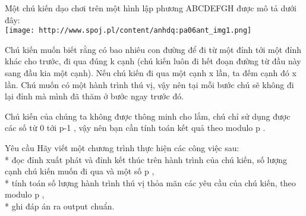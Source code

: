 Một chú kiến dạo chơi trên một hình lập phương ABCDEFGH được mô tả dưới đây:   
\\
\texttt{[image: http://www.spoj.pl/content/anhdq:pa06ant\_img1.png]}



   Chú kiến muốn biết rằng có bao nhiêu con đường để đi từ một đỉnh tới một đỉnh khác cho trước, đi qua đúng       k      cạnh (chú kiến luôn đi hết đoạn đường từ đầu này sang đầu kia một cạnh). Nếu chú kiến đi qua một cạnh       x      lần, ta đếm cạnh đó       x      lần. Chú muốn có một hành trình thú vị, vậy nên tại mỗi bước chú sẽ không đi lại đỉnh mà mình đã thăm ở bước ngay trước đó.  

   Chú kiến của chúng ta không được thông minh cho lắm, chú chỉ sử dụng được các số từ       0      tới       p-1      , vậy nên bạn cần tính toán kết quả theo modulo       p      .  

Yêu cầu
Hãy viết một chương trình thực hiện các công việc sau:   
\\   * đọc đỉnh xuất phát và đỉnh kết thúc trên hành trình của chú kiến, số lượng cạnh chú kiến muốn đi qua và một số       p      ,   
\\   * tính toán số lượng hành trình thú vị thỏa mãn các yêu cầu của chú kiến, theo modulo       p      ,   
\\   * ghi đáp án ra output chuẩn.